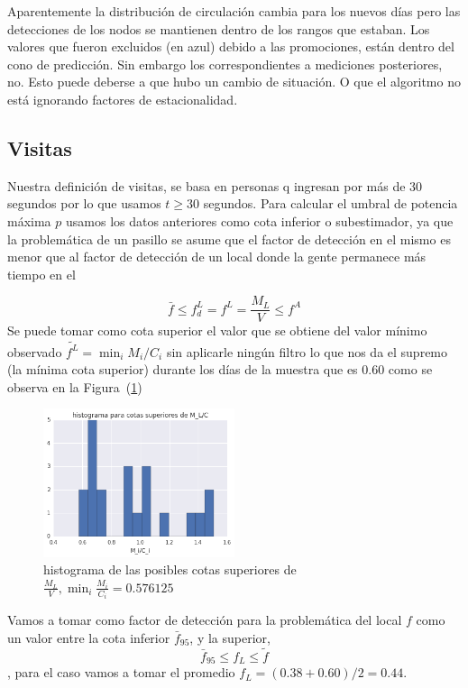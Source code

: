Aparentemente la distribución de circulación cambia para los nuevos días pero
las detecciones de los nodos se mantienen dentro de los rangos que estaban. Los valores que 
fueron excluidos (en azul) debido a las promociones, están dentro del cono de predicción. Sin embargo los correspondientes a mediciones posteriores, no. Esto puede deberse a que hubo un cambio de situación. O que el algoritmo no está ignorando factores de estacionalidad.


\subsection{Visitas}
Nuestra definición de visitas, se basa en personas q ingresan por más de 30 segundos
por lo que usamos $t \ge 30$ segundos. Para calcular el umbral de potencia máxima $p$
usamos los datos anteriores como cota inferior o subestimador, 
ya que la problemática de un pasillo se asume que el factor de detección en el mismo 
es menor que al factor de detección de un local donde la gente permanece más tiempo en el

\[
\bar{f} \le f^L_d = f^L = \frac{M_L}{V} \le f^A
\]
Se puede tomar como cota superior el valor que se 
obtiene del valor mínimo observado 
$\widetilde{f^L} = \min_i M_i/C_i$ sin aplicarle ningún filtro
lo que nos da el supremo (la mínima cota superior)
durante los días de la muestra que es $0.60$ como se observa en la Figura~(\ref{fig:CotaSup})

\begin{figure}[H] 
  \centering
  \includegraphics[width=0.5\textwidth]{cota_sup_hist.png}
  \caption{
    histograma de las posibles cotas superiores de $\frac{M_L}{V},
    \min_i \frac{M_i}{C_i} = 0.576125$
  }
  \label{fig:CotaSup}
\end{figure}

Vamos a tomar como factor de detección para la problemática del local $f$
como un valor entre la cota inferior $\bar{f}_{95}$,
y la superior,
\[
\bar{f}_{95} \le f_L \le \widetilde{f}
\],
para el caso vamos a tomar el promedio
$f_L = (0.38 + 0.60)/2 = 0.44$.

